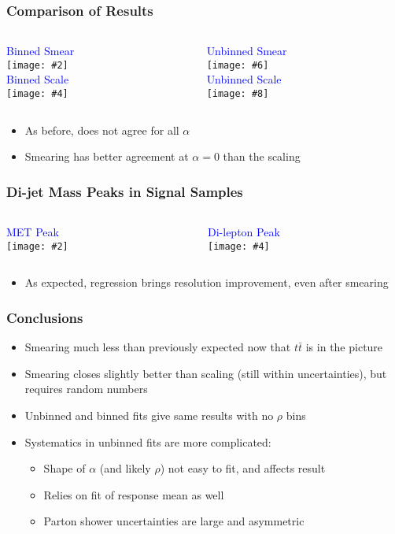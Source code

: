 \documentclass{beamer}
\newcommand{\beginbackup}{
  \newcounter{framenumbervorappendix}
  \setcounter{framenumbervorappendix}{\value{framenumber}}
}
\newcommand{\backupend}{
  \addtocounter{framenumbervorappendix}{-\value{framenumber}}
  \addtocounter{framenumber}{\value{framenumbervorappendix}}
}
\newcommand{\twofigs}[4]{
  \begin{columns}
    \begin{column}{0.5\linewidth}
      \centering
      \textcolor{blue}{#1} \\
      \texttt{[image: \#2]}
    \end{column}
    \begin{column}{0.5\linewidth}
      \centering
      \textcolor{blue}{#3} \\
      \texttt{[image: \#4]}
    \end{column}
  \end{columns}
}
\newcommand{\fourfigs}[8]{
  \begin{columns}
    \begin{column}{0.3\linewidth}
      \centering
      \textcolor{blue}{#1} \\
      \texttt{[image: \#2]} \\
      \textcolor{blue}{#3} \\
      \texttt{[image: \#4]}
    \end{column}
    \begin{column}{0.3\linewidth}
      \centering
      \textcolor{blue}{#5} \\
      \texttt{[image: \#6]} \\
      \textcolor{blue}{#7} \\
      \texttt{[image: \#8]}
    \end{column}
  \end{columns}
}
\begin{document}
\begin{frame}
  \frametitle{Comparison of Results}

  \fourfigs{Binned Smear}
           {200122_comparison_resolution/resolution_jet1_response_single_smear_nominal_smear_0.pdf}
           {Binned Scale}
           {200122_comparison_resolution/resolution_jet1_response_single_scale_nominal_smear_0.pdf}
           {Unbinned Smear}
           {200122_comparison_resolution/resolution_jet1_response_unbinned_smear_nominal_smear_0.pdf}
           {Unbinned Scale}
           {200122_comparison_resolution/resolution_jet1_response_unbinned_scale_nominal_smear_0.pdf}

  \begin{itemize}
  \item As before, does not agree for all $\alpha$
  \item Smearing has better agreement at $\alpha = 0$ than the scaling
  \end{itemize}

\end{frame}


\begin{frame}
  \frametitle{Di-jet Mass Peaks in Signal Samples}

  \twofigs{MET Peak}
          {200123_metpeak/comparison.pdf}
          {Di-lepton Peak}
          {200123_leppeak/comparison.pdf}

  \begin{itemize}
  \item As expected, regression brings resolution improvement,
    even after smearing
  \end{itemize}

\end{frame}


\begin{frame}
  \frametitle{Conclusions}

  \begin{itemize}
  \item Smearing much less than previously expected now that $t\bar{t}$ is in the picture
  \item Smearing closes slightly better than scaling (still within uncertainties),
    but requires random numbers
  \item Unbinned and binned fits give same results with no $\rho$ bins
  \item Systematics in unbinned fits are more complicated:
    \begin{itemize}
    \item Shape of $\alpha$ (and likely $\rho$) not easy to fit, and affects result
    \item Relies on fit of response mean as well
    \item Parton shower uncertainties are large and asymmetric
    \end{itemize}
  \end{itemize}

\end{frame}


\begin{comment}
\beginbackup

\begin{frame}
  \centering
    {\Huge \bf\sffamily Backup Slides}
\end{frame}



\backupend
\end{comment}
\end{document}
